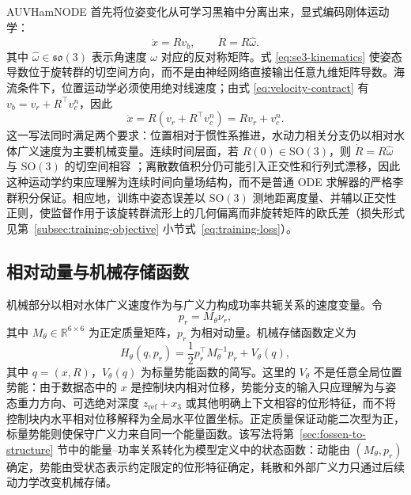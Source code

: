 \documentclass[UTF8,zihao=-4]{ctexrep}
\newcommand{\R}{\mathbb{R}}
\newcommand{\SO}{\mathrm{SO}}
\begin{document}
AUVHamNODE 首先将位姿变化从可学习黑箱中分离出来，显式编码刚体运动学：
\begin{equation}
  \dot x=Rv_b,\qquad
  \dot R=R\widehat\omega .
  \label{eq:se3-kinematics}
\end{equation}
其中 \(\widehat\omega\in\mathfrak{so}(3)\) 表示角速度 \(\omega\) 对应的反对称矩阵。式 \eqref{eq:se3-kinematics} 使姿态导数位于旋转群的切空间方向，而不是由神经网络直接输出任意九维矩阵导数。海流条件下，位置运动学必须使用绝对线速度；由式 \eqref{eq:velocity-contract} 有 \(v_b=v_r+R^\top v_c^n\)，因此
\begin{equation}
  \dot x=R(v_r+R^\top v_c^n)=Rv_r+v_c^n .
  \label{eq:position-kinematics-current}
\end{equation}
这一写法同时满足两个要求：位置相对于惯性系推进，水动力相关分支仍以相对水体广义速度为主要机械变量。连续时间层面，若 \(R(0)\in\SO(3)\)，则 \(\dot R=R\widehat\omega\) 与 \(\SO(3)\) 的切空间相容 \citep{bullo2004geometric,hairer2006geometric}；离散数值积分仍可能引入正交性和行列式漂移，因此这种运动学约束应理解为连续时间向量场结构，而不是普通 ODE 求解器的严格李群积分保证。相应地，训练中姿态误差以 \(\SO(3)\) 测地距离度量、并辅以正交性正则，使监督作用于该旋转群流形上的几何偏离而非旋转矩阵的欧氏差（损失形式见第~\ref{subsec:training-objective} 小节式~\eqref{eq:training-loss}）。

\subsection{相对动量与机械存储函数}

机械部分以相对水体广义速度作为与广义力构成功率共轭关系的速度变量。令
\begin{equation}
  p_r=M_\theta\nu_r ,
  \label{eq:relative-momentum}
\end{equation}
其中 \(M_\theta\in\R^{6\times6}\) 为正定质量矩阵，\(p_r\) 为相对动量。机械存储函数定义为
\begin{equation}
  H_\theta(q,p_r)
  =
  \frac12p_r^\top M_\theta^{-1}p_r
  +V_\theta(q),
  \label{eq:hamiltonian}
\end{equation}
其中 \(q=(x,R)\)，\(V_\theta(q)\) 为标量势能函数的简写。这里的 \(V_\theta\) 不是任意全局位置势能：由于数据态中的 \(x\) 是控制块内相对位移，势能分支的输入只应理解为与姿态重力方向、可选绝对深度 \(z_{\mathrm{ref}}+x_3\) 或其他明确上下文相容的位形特征，而不将控制块内水平相对位移解释为全局水平位置坐标。正定质量保证动能二次型为正，标量势能则使保守广义力来自同一个能量函数。该写法将第~\ref{sec:fossen-to-structure} 节中的能量--功率关系转化为模型定义中的状态函数：动能由 \((M_\theta,p_r)\) 确定，势能由受状态表示约定限定的位形特征确定，耗散和外部广义力只通过后续动力学改变机械存储。
\end{document}
